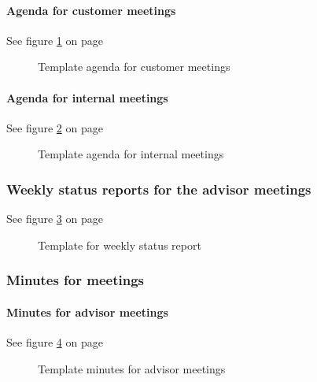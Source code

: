 \paragraph{Agenda for customer meetings} \hfill
\newline
See figure \ref{fig:agendacustomer} on page \pageref{fig:agendacustomer}
\begin{figure}[hbt]
\begin{center}
\caption{Template agenda for customer meetings}\label{fig:agendacustomer}
\end{center}
\end{figure}

\paragraph{Agenda for internal meetings} \hfill
\newline
See figure \ref{fig:agendainternal} on page \pageref{fig:agendainternal}
\begin{figure}[hbt]
\begin{center}
\caption{Template agenda for internal meetings}\label{fig:agendainternal}
\end{center}
\end{figure}

\subsubsection{Weekly status reports for the advisor meetings}
See figure \ref{fig:weekly} on page \pageref{fig:weekly}
\begin{figure}[hbt]
\begin{center}
\caption{Template for weekly status report}\label{fig:weekly}
\end{center}
\end{figure}

\subsubsection{Minutes for meetings}

\paragraph{Minutes for advisor meetings} \hfill
\newline
See figure \ref{fig:minutesadvisor} on page \pageref{fig:minutesadvisor}
\begin{figure}[hbt]
\begin{center}
\caption{Template minutes for advisor meetings}\label{fig:minutesadvisor}
\end{center}
\end{figure}

